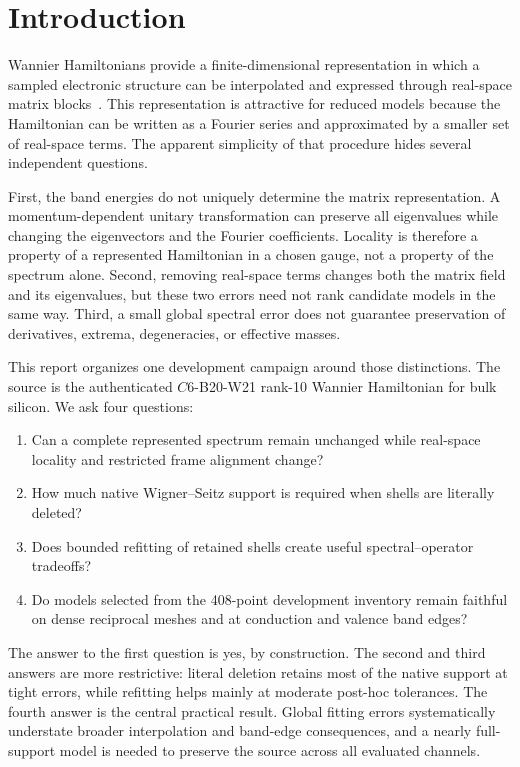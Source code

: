 \documentclass[11pt]{article}
\begin{document}
\section{Introduction}

Wannier Hamiltonians provide a finite-dimensional representation in which a sampled
electronic structure can be interpolated and expressed through real-space matrix
blocks~\cite{MarzariVanderbilt1997,SouzaMarzariVanderbilt2001,Mostofi2014,Yates2007}.
This representation is attractive for reduced models because the Hamiltonian can be
written as a Fourier series and approximated by a smaller set of real-space terms.
The apparent simplicity of that procedure hides several independent questions.

First, the band energies do not uniquely determine the matrix representation.  A
momentum-dependent unitary transformation can preserve all eigenvalues while changing
the eigenvectors and the Fourier coefficients.  Locality is therefore a property of a
represented Hamiltonian in a chosen gauge, not a property of the spectrum alone.
Second, removing real-space terms changes both the matrix field and its eigenvalues, but
these two errors need not rank candidate models in the same way.  Third, a small global
spectral error does not guarantee preservation of derivatives, extrema, degeneracies,
or effective masses.

This report organizes one development campaign around those distinctions.  The source
is the authenticated \(C6\)-B20-W21 rank-10 Wannier Hamiltonian for bulk silicon.  We
ask four questions:

\begin{enumerate}
  \item Can a complete represented spectrum remain unchanged while real-space locality
    and restricted frame alignment change?
  \item How much native Wigner--Seitz support is required when shells are literally
    deleted?
  \item Does bounded refitting of retained shells create useful spectral--operator
    tradeoffs?
  \item Do models selected from the 408-point development inventory remain faithful on
    dense reciprocal meshes and at conduction and valence band edges?
\end{enumerate}

The answer to the first question is yes, by construction.  The second and third answers
are more restrictive: literal deletion retains most of the native support at tight
errors, while refitting helps mainly at moderate post-hoc tolerances.  The fourth answer
is the central practical result.  Global fitting errors systematically understate
broader interpolation and band-edge consequences, and a nearly full-support model is
needed to preserve the source across all evaluated channels.
\end{document}
